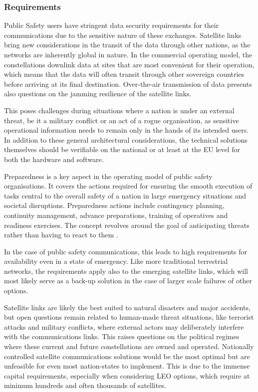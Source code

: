 \documentclass[english, 12pt, a4paper, elec, utf8, a-1b, online]{aaltothesis}
\begin{document}
\subsubsection{Requirements}

Public Safety users have stringent data security requirements for their communications due to the sensitive nature of these exchanges.
Satellite links bring new considerations in the transit of the data through other nations, as the networks are inherently global in nature.
In the commercial operating model, the constellations downlink data at sites that are most convenient for their operation, which means that the data will often transit through other sovereign countries before arriving at its final destination.
Over-the-air transmission of data presents also questions on the jamming resilience of the satellite links.

This poses challenges during situations where a nation is under an external threat, be it a military conflict or an act of a rogue organisation, as sensitive operational information needs to remain only in the hands of its intended users. In addition to these general architectural considerations, the technical solutions themselves should be verifiable on the national or at least at the EU level for both the hardware and software.

Preparedness is a key aspect in the operating model of public safety organisations. It covers the actions required for ensuring the smooth execution of tasks central to the overall safety of a nation in large emergency situations and societal disruptions. Preparedness actions include contingency planning, continuity management, advance preparations, training of operatives and readiness exercises. The concept revolves around the goal of anticipating threats rather than having to react to them \cite{turvallisuuskomitea-ennakointi-varautuminen}.

In the case of public safety communications, this leads to high requirements for availability even in a state of emergency.
Like more traditional terrestrial networks, the requirements apply also to the emerging satellite links, which will most likely serve as a back-up solution in the case of larger scale failures of other options.

Satellite links are likely the best suited to natural disasters and major accidents, but open questions remain related to human-made threat situations, like terrorist attacks and military conflicts, where external actors may deliberately interfere with the communications links.
This raises questions on the political regimes where these current and future constellations are owned and operated. Nationally controlled satellite communications solutions would be the most optimal but are unfeasible for even most nation-states to implement. This is due to the immense capital requirements, especially when considering LEO options, which require at minimum hundreds and often thousands of satellites.
\end{document}
